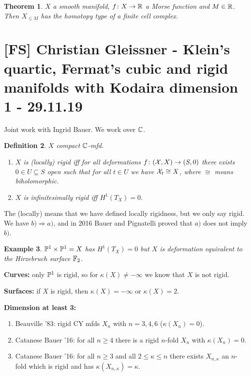 \documentclass[A4paper, british, reqno]{amsart}
\theoremstyle{darkgreentheorem}
\newtheorem{thm}{Theorem}[section]
\theoremstyle{darkbluedefinition}
\newtheorem{defn}[thm]{Definition}
\theoremstyle{darkredexample}
\newtheorem{exa}[thm]{Example}
\theoremstyle{remark}
\newcommand{\1}{\mathbbm{1}}
\newcommand{\tms}{\times}
\newcommand{\sub}{\subseteq}
\begin{document}
\begin{thm}
    $X$ a smooth manifold, $f\colon X\to \R$ a Morse function and $M\in \R$.
    Then $X_{\leqslant M}$ has the homotopy type of a finite cell complex.
\end{thm}

\section{[FS] Christian Gleissner - Klein's quartic, Fermat's cubic and rigid manifolds with Kodaira dimension 1 - 29.11.19}

Joint work with Ingrid Bauer.
We work over $\C$.

\begin{defn}
    $X$ compact $\C$-mfd.
    \begin{enumerate}[label=\alph*)]
	\item $X$ is (locally) rigid iff for all deformations $f\colon (\X,X)\to (S,0)$ there exists $0\in U\sub S$ open such that for all $t\in U$ we have $\X_{t}\cong X$, where $\cong$ means biholomorphic.
	\item $X$ is infinitesimally rigid iff $H^{1}(T_{X})=0$.
    \end{enumerate}
\end{defn}

The (locally) means that we have defined locally rigidness, but we only say rigid.
We have $b)\Rightarrow a)$, and in 2016 Bauer and Pignatelli proved that $a)$ does not imply $b)$.

\begin{exa}
    $\P^{1}\tms\P^{1}=X$ has $H^{1}(T_{X})=0$ but $X$ is deformation equivalent to the Hirzebruch surface $\bbF_{2}$.
\end{exa}

\textbf{Curves:} only $\P^{1}$ is rigid, so for $\kappa(X)\neq -\infty$ we know that $X$ is not rigid.

\textbf{Surfaces:} if $X$ is rigid, then $\kappa(X)=-\infty$ or $\kappa(X)=2$.

\textbf{Dimension at least 3:}
\begin{enumerate}[label=\alph*)]
    \item Beauville '83: rigid CY mfds $X_{n}$ with $n=3,4,6$ ($\kappa(X_{n})=0$).
    \item Catanese Bauer '16: for all $n\geqslant 4$ there is a rigid $n$-fold $X_{n}$ with $\kappa(X_{n})=0$.
    \item Catanese Bauer '16: for all $n\geqslant 3$ and all $2\leqslant \kappa\leqslant n$ there exists $X_{n,\kappa}$ an $n$-fold which is rigid and has $\kappa(X_{n,\kappa})=\kappa$.
\end{enumerate}
\end{document}
